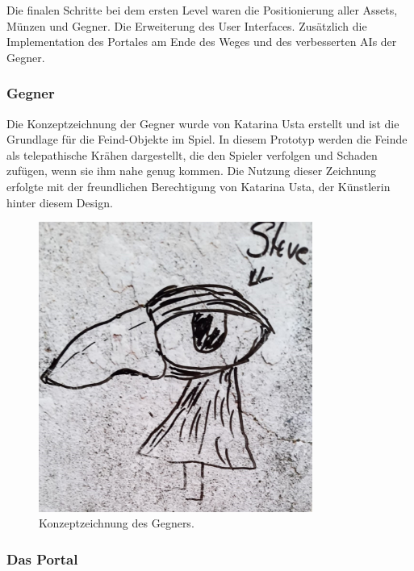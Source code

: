 Die finalen Schritte bei dem ersten Level waren die Positionierung aller Assets, Münzen und Gegner. Die Erweiterung des User Interfaces. Zusätzlich die Implementation des Portales am Ende des Weges und des verbesserten AIs der Gegner.

\subsubsection{Gegner}


\begin{minipage}[t]{0.5\textwidth}
Die Konzeptzeichnung der Gegner wurde von Katarina Usta erstellt und ist die Grundlage für die Feind-Objekte im Spiel. In diesem Prototyp werden die Feinde als telepathische Krähen dargestellt, die den Spieler verfolgen und Schaden zufügen, wenn sie ihm nahe genug kommen. Die Nutzung dieser Zeichnung erfolgte mit der freundlichen Berechtigung von Katarina Usta, der Künstlerin hinter diesem Design.

\end{minipage}
\hfill
\begin{minipage}[t]{0.5\textwidth}
  \begin{figure}[H]
    \centering
    \includegraphics[width=0.8\textwidth]{chapters/04/images/V3/steve.jpg}
    \caption{Konzeptzeichnung des Gegners.}
  \end{figure}
\end{minipage}

\subsubsection{Das Portal}


